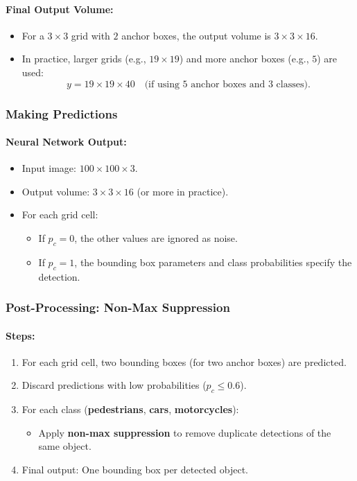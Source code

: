 \documentclass[letterpaper,12pt,notitlepage,twoside]{report}
\begin{document}
\paragraph{Final Output Volume:}
\begin{itemize}
    \item For a $3 \times 3$ grid with $2$ anchor boxes, the output volume is $3 \times 3 \times 16$.
    \item In practice, larger grids (e.g., $19 \times 19$) and more anchor boxes (e.g., $5$) are used:
    \[
    y = 19 \times 19 \times 40 \quad \text{(if using 5 anchor boxes and 3 classes)}.
    \]
\end{itemize}

\subsubsection*{Making Predictions}

\paragraph{Neural Network Output:}
\begin{itemize}
    \item Input image: $100 \times 100 \times 3$.
    \item Output volume: $3 \times 3 \times 16$ (or more in practice).
    \item For each grid cell:
    \begin{itemize}
        \item If $p_c = 0$, the other values are ignored as noise.
        \item If $p_c = 1$, the bounding box parameters and class probabilities specify the detection.
    \end{itemize}
\end{itemize}

\subsubsection*{Post-Processing: Non-Max Suppression}
\paragraph{Steps:}
\begin{enumerate}[nosep]
    \item For each grid cell, two bounding boxes (for two anchor boxes) are predicted.
    \item Discard predictions with low probabilities ($p_c \leq 0.6$).
    \item For each class (\textbf{pedestrians}, \textbf{cars}, \textbf{motorcycles}):
    \begin{itemize}
        \item Apply \textbf{non-max suppression} to remove duplicate detections of the same object.
    \end{itemize}
    \item Final output: One bounding box per detected object.
\end{enumerate}
\end{document}
